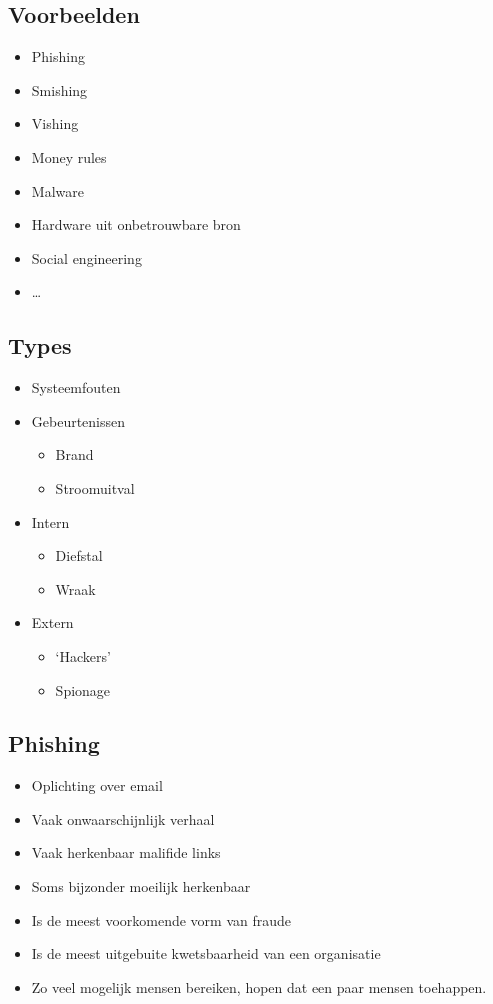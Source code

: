\documentclass{article}
\begin{document}
\subsection{Voorbeelden}

\begin{itemize}
    \item Phishing
    \item Smishing
    \item Vishing
    \item Money rules
    \item Malware
    \item Hardware uit onbetrouwbare bron
    \item Social engineering
    \item \dots
\end{itemize}

\subsection{Types}

\begin{itemize}
    \item Systeemfouten
    \item Gebeurtenissen
    \begin{itemize}
        \item Brand
        \item Stroomuitval
    \end{itemize}
    \item Intern
    \begin{itemize}
        \item Diefstal
        \item Wraak
    \end{itemize}
    \item Extern
    \begin{itemize}
        \item `Hackers'
        \item Spionage
    \end{itemize}
\end{itemize}

\subsection{Phishing}

\begin{itemize}
    \item Oplichting over email
    \item Vaak onwaarschijnlijk verhaal
    \item Vaak herkenbaar malifide links
    \item Soms bijzonder moeilijk herkenbaar
    \item Is de meest voorkomende vorm van fraude
    \item Is de meest uitgebuite kwetsbaarheid van een organisatie
    \item Zo veel mogelijk mensen bereiken, hopen dat een paar mensen toehappen.
\end{itemize}
\end{document}
